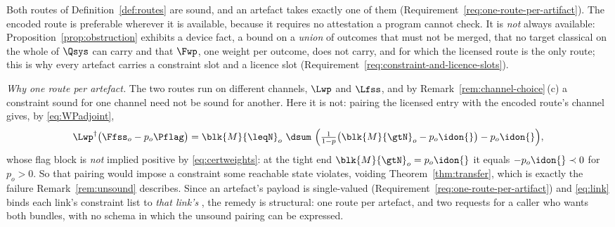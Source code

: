 \begin{remark}\label{rem:tworoutes}
Both routes of Definition~\ref{def:routes} are sound, and an artefact takes
exactly one of them (Requirement~\ref{req:one-route-per-artifact}). The encoded route is
preferable wherever it is available, because it requires no attestation a
program cannot check. It is \emph{not} always available:
Proposition~\ref{prop:obstruction} exhibits a device fact, a bound on a
\emph{union} of outcomes that must not be merged, that no target classical on
the whole of $\Qsys$ can carry and that $\Fwp$, one weight per outcome, does
not carry, and for which the licensed route is the only route; this is why
every artefact carries a constraint slot and a licence slot
(Requirement~\ref{req:constraint-and-licence-slots}).

\emph{Why one route per artefact.} The two routes run on different channels,
$\Lwp$ and $\Lfss$, and by Remark~\ref{rem:channel-choice}\,(c) a constraint
sound for one channel need not be sound for another. Here it is not: pairing
the licensed entry with the encoded route's channel gives, by
\eqref{eq:WPadjoint},
\begin{equation}\label{eq:crosspairing}
  \Lwp^{\dagger}\big(\Ffss_o-p_o\Pflag\big)
  =\blk{M}{\leqN}_o\ \dsum\
   \Big(\tfrac{1}{1-p}\big(\blk{M}{\gtN}_o-p_o\idon{}\big)-p_o\idon{}\Big),
\end{equation}
whose flag block is \emph{not} implied positive by \eqref{eq:certweights}: at
the tight end $\blk{M}{\gtN}_o=p_o\idon{}$ it equals $-p_o\idon{}\prec0$ for
$p_o>0$. So that pairing would impose a constraint some reachable state
violates, voiding Theorem~\ref{thm:transfer}, which is exactly the failure
Remark~\ref{rem:unsound} describes. Since an artefact's payload is
single-valued (Requirement~\ref{req:one-route-per-artifact}) and
\eqref{eq:link} binds each link's constraint list to \emph{that link's}
\tref{channel witness}, the remedy is structural: one route per artefact, and
two requests for a caller who wants both bundles, with no schema in which the
unsound pairing can be expressed.
\end{remark}
